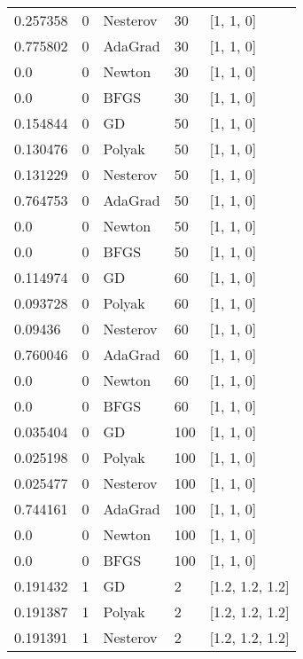 \begin{tabular}{lllll}
  0.257358 &        0 & Nesterov &     30 &        [1, 1, 0] \\
  0.775802 &        0 &  AdaGrad &     30 &        [1, 1, 0] \\
       0.0 &        0 &   Newton &     30 &        [1, 1, 0] \\
       0.0 &        0 &     BFGS &     30 &        [1, 1, 0] \\
  0.154844 &        0 &       GD &     50 &        [1, 1, 0] \\
  0.130476 &        0 &   Polyak &     50 &        [1, 1, 0] \\
  0.131229 &        0 & Nesterov &     50 &        [1, 1, 0] \\
  0.764753 &        0 &  AdaGrad &     50 &        [1, 1, 0] \\
       0.0 &        0 &   Newton &     50 &        [1, 1, 0] \\
       0.0 &        0 &     BFGS &     50 &        [1, 1, 0] \\
  0.114974 &        0 &       GD &     60 &        [1, 1, 0] \\
  0.093728 &        0 &   Polyak &     60 &        [1, 1, 0] \\
   0.09436 &        0 & Nesterov &     60 &        [1, 1, 0] \\
  0.760046 &        0 &  AdaGrad &     60 &        [1, 1, 0] \\
       0.0 &        0 &   Newton &     60 &        [1, 1, 0] \\
       0.0 &        0 &     BFGS &     60 &        [1, 1, 0] \\
  0.035404 &        0 &       GD &    100 &        [1, 1, 0] \\
  0.025198 &        0 &   Polyak &    100 &        [1, 1, 0] \\
  0.025477 &        0 & Nesterov &    100 &        [1, 1, 0] \\
  0.744161 &        0 &  AdaGrad &    100 &        [1, 1, 0] \\
       0.0 &        0 &   Newton &    100 &        [1, 1, 0] \\
       0.0 &        0 &     BFGS &    100 &        [1, 1, 0] \\
  0.191432 &        1 &       GD &      2 &  [1.2, 1.2, 1.2] \\
  0.191387 &        1 &   Polyak &      2 &  [1.2, 1.2, 1.2] \\
  0.191391 &        1 & Nesterov &      2 &  [1.2, 1.2, 1.2] \\

\end{tabular}
